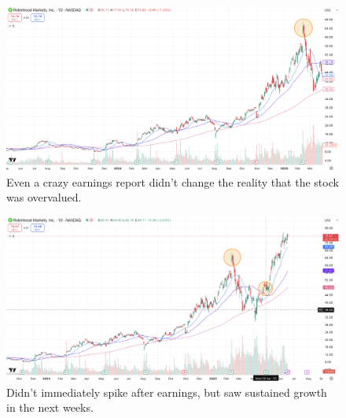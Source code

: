 \documentclass[11pt]{article}
\begin{document}
    \begin{figure}[H]
        \centering
        \includegraphics[width=1.0\linewidth]{images/HOOD1.png}
        \caption{Even a crazy earnings report didn't change the reality that the stock was overvalued.}
        \label{fig:HOOD1}
    \end{figure}

    \begin{figure}[H]
        \centering
        \includegraphics[width=1.0\linewidth]{images/HOOD2.png}
        \caption{Didn't immediately spike after earnings, but saw sustained growth in the next weeks.}
        \label{fig:HOOD2}
    \end{figure}
\end{document}
